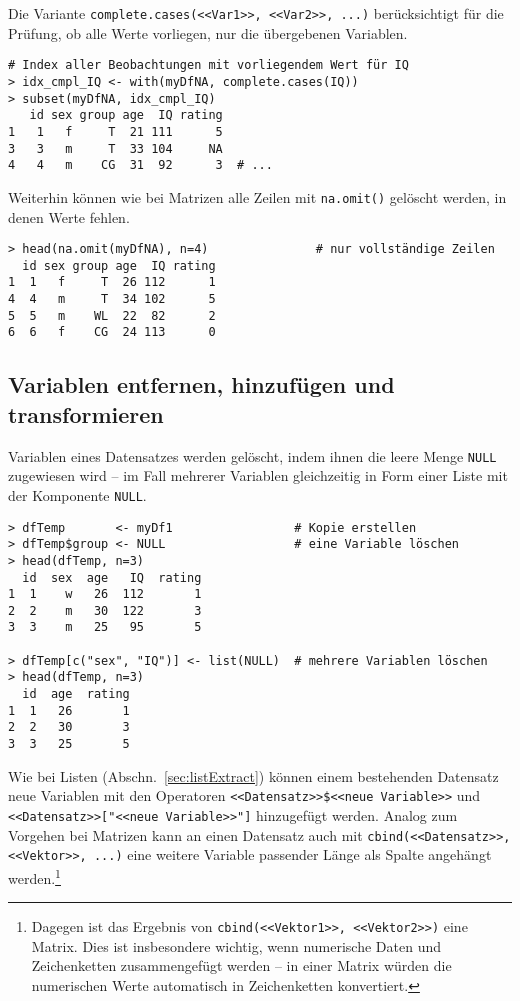 Die Variante \lstinline!complete.cases(<<Var1>>, <<Var2>>, ...)! berücksichtigt für die Prüfung, ob alle Werte vorliegen, nur die übergebenen Variablen.
\begin{lstlisting}
# Index aller Beobachtungen mit vorliegendem Wert für IQ
> idx_cmpl_IQ <- with(myDfNA, complete.cases(IQ))
> subset(myDfNA, idx_cmpl_IQ)
   id sex group age  IQ rating
1   1   f     T  21 111      5
3   3   m     T  33 104     NA
4   4   m    CG  31  92      3  # ...
\end{lstlisting}

Weiterhin können wie bei Matrizen alle Zeilen mit \lstinline!na.omit()! gelöscht werden, in denen Werte fehlen.
\begin{lstlisting}
> head(na.omit(myDfNA), n=4)               # nur vollständige Zeilen
  id sex group age  IQ rating
1  1   f     T  26 112      1
4  4   m     T  34 102      5
5  5   m    WL  22  82      2
6  6   f    CG  24 113      0
\end{lstlisting}

\subsection{Variablen entfernen, hinzufügen und transformieren}
\label{sec:df_transform}

Variablen eines Datensatzes werden gelöscht, indem ihnen die leere Menge \lstinline!NULL! zugewiesen wird -- im Fall mehrerer Variablen gleichzeitig in Form einer Liste mit der Komponente \lstinline!NULL!.
\begin{lstlisting}
> dfTemp       <- myDf1                 # Kopie erstellen
> dfTemp$group <- NULL                  # eine Variable löschen
> head(dfTemp, n=3)
  id  sex  age   IQ  rating
1  1    w   26  112       1
2  2    m   30  122       3
3  3    m   25   95       5

> dfTemp[c("sex", "IQ")] <- list(NULL)  # mehrere Variablen löschen
> head(dfTemp, n=3)
  id  age  rating
1  1   26       1
2  2   30       3
3  3   25       5
\end{lstlisting}

Wie bei Listen (Abschn.\ \ref{sec:listExtract}) können einem bestehenden Datensatz neue Variablen mit den Operatoren \lstinline!<<Datensatz>>$<<neue Variable>>! und \lstinline!<<Datensatz>>["<<neue Variable>>"]! hinzugefügt werden. Analog zum Vorgehen bei Matrizen kann an einen Datensatz auch mit \lstinline!cbind(<<Datensatz>>, <<Vektor>>, ...)! eine weitere Variable passender Länge als Spalte angehängt werden.\footnote{Dagegen ist das Ergebnis von \lstinline!cbind(<<Vektor1>>, <<Vektor2>>)! eine Matrix. Dies ist insbesondere wichtig, wenn numerische Daten und Zeichenketten zusammengefügt werden -- in einer Matrix würden die numerischen Werte automatisch in Zeichenketten konvertiert.}

